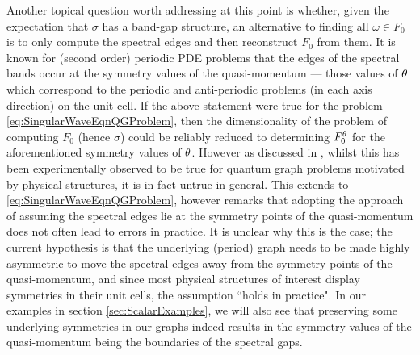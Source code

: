 Another topical question worth addressing at this point is whether, given the expectation that $\sigma$ has a band-gap structure, an alternative to finding all $\omega\in F_0$ is to only compute the spectral edges and then reconstruct $F_0$ from them.
It is known for (second order) periodic PDE problems that the edges of the spectral bands occur at the symmetry values of the quasi-momentum --- those values of $\theta$ which correspond to the periodic and anti-periodic problems (in each axis direction) on the unit cell.
If the above statement were true for the problem \eqref{eq:SingularWaveEqnQGProblem}, then the dimensionality of the problem of computing $F_0$ (hence $\sigma$) could be reliably reduced to determining $F_0^\theta$ for the aforementioned symmetry values of $\theta$.
However as discussed in \cite[Chapter 4.6]{berkolaiko2013introduction}, whilst this has been experimentally observed to be true for quantum graph problems motivated by physical structures, it is in fact untrue in general.
This extends to \eqref{eq:SingularWaveEqnQGProblem}, however \cite[Chapter 4.6]{berkolaiko2013introduction} remarks that adopting the approach of assuming the spectral edges lie at the symmetry points of the quasi-momentum does not often lead to errors in practice.
It is unclear why this is the case; the current hypothesis is that the underlying (period) graph needs to be made highly asymmetric to move the spectral edges away from the symmetry points of the quasi-momentum, and since most physical structures of interest display symmetries in their unit cells, the assumption ``holds in practice".
In our examples in section \ref{sec:ScalarExamples}, we will also see that preserving some underlying symmetries in our graphs indeed results in the symmetry values of the quasi-momentum being the boundaries of the spectral gaps.